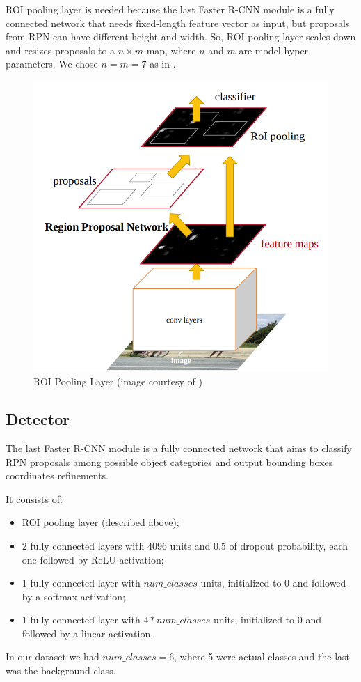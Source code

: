 \documentclass[a4paper,10pt]{report}
\begin{document}
ROI pooling layer is needed because the last Faster R-CNN module is a fully connected network that needs fixed-length feature vector as input, but proposals from RPN can have different height and width. So, ROI pooling layer scales down and resizes proposals to a $n \times m$ map, where $n$ and $m$ are model hyper-parameters. We chose $n=m=7$ as in \cite{faster-rcnn}.
\begin{figure}[h]
  \center
  \includegraphics[width=0.7\linewidth]{roi-pooling}
  \caption{ROI Pooling Layer (image courtesy of \cite{roi-pooling})}
  \label{fig:roi-pooling}
\end{figure}

\subsection{Detector}\label{subsec:detector}
The last Faster R-CNN module is a fully connected network that aims to classify RPN proposals among possible object categories and output bounding boxes coordinates refinements.

It consists of:
\begin{itemize}
    \item ROI pooling layer (described above);
    \item 2 fully connected layers with 4096 units and $0.5$ of dropout probability, each one followed by ReLU activation;
    \item 1 fully connected layer with $num\_classes$ units, initialized to 0 and followed by a softmax activation;
    \item 1 fully connected layer with $4*num\_classes$ units, initialized to 0 and followed by a linear activation.
\end{itemize}
In our dataset we had $num\_classes=6$, where 5 were actual classes and the last was the background class.
\end{document}
